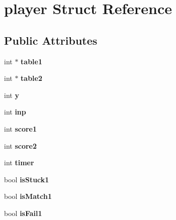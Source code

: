 \hypertarget{structplayer}{\section{player Struct Reference}
\label{structplayer}
}
\subsection*{Public Attributes}
\begin{DoxyCompactItemize}
\item 
\hypertarget{structplayer_a76494309e5202ee335857fd0bb077f79}{int $\ast$ {\bfseries table1}}\label{structplayer_a76494309e5202ee335857fd0bb077f79}

\item 
\hypertarget{structplayer_abc44e615336fff64309e216cc9bdb0a2}{int $\ast$ {\bfseries table2}}\label{structplayer_abc44e615336fff64309e216cc9bdb0a2}

\item 
\hypertarget{structplayer_ab1da25240a30a5563d4e0714dade1575}{int {\bfseries y}}\label{structplayer_ab1da25240a30a5563d4e0714dade1575}

\item 
\hypertarget{structplayer_adfbe8d13ade92dafd1d401e1dd269279}{int {\bfseries inp}}\label{structplayer_adfbe8d13ade92dafd1d401e1dd269279}

\item 
\hypertarget{structplayer_a749d75703ca9709cd1bb407bd916c026}{int {\bfseries score1}}\label{structplayer_a749d75703ca9709cd1bb407bd916c026}

\item 
\hypertarget{structplayer_a9315508398e0724eb761fd47ae052cd8}{int {\bfseries score2}}\label{structplayer_a9315508398e0724eb761fd47ae052cd8}

\item 
\hypertarget{structplayer_a0743ab5c041aae9c119a5e8298b6353a}{int {\bfseries timer}}\label{structplayer_a0743ab5c041aae9c119a5e8298b6353a}

\item 
\hypertarget{structplayer_ac335f4e82dab5e2dd006bd5e43ea747e}{bool {\bfseries is\+Stuck1}}\label{structplayer_ac335f4e82dab5e2dd006bd5e43ea747e}

\item 
\hypertarget{structplayer_a615fec1e87c14b7f47ff95311bfce9c0}{bool {\bfseries is\+Match1}}\label{structplayer_a615fec1e87c14b7f47ff95311bfce9c0}

\item 
\hypertarget{structplayer_aae2e920260ae5766f182053fce6921f1}{bool {\bfseries is\+Fail1}}\label{structplayer_aae2e920260ae5766f182053fce6921f1}


\end{DoxyCompactItemize}
